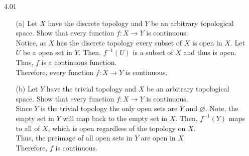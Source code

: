 \documentclass[12pt]{article}
\begin{document}
\pagestyle{fancy}  
\lfoot{} \cfoot{} \rfoot{}

\begin{enumerate}

	\item[4.01] 
	\begin{enumerate}
	
	\item[(a)] Let $X$ have the discrete topology and $Y$ be an arbitrary topological space.
	Show that every function $f : X \rightarrow Y$ is continuous.\\
	Notice, as $ X $ has the discrete topology every subset of $ X $ is open in $ X $. Let $ U $ be a open set in $ Y $. Then, $ f^{-1}(U) $ is a subset of $ X $ and thus is open. \\
	Thus, $ f $ is a continuous function. \\
	Therefore, every function $f : X \rightarrow Y$ is continuous.
	\item[(b)]Let $Y$ have the trivial topology and $X$ be an arbitrary topological space.
	Show that every function $f : X \rightarrow Y$ is continuous.\\
	Since $ Y $ is the trivial topology the only open sets are $ Y $ and $ \varnothing $. Note, the empty set in $ Y $ will map back to the empty set in $ X $. Then, $ f^{-1}(Y) $ maps to all of $ X $, which is open regardless of the topology on $ X $.\\
	Thus, the preimage of all open sets in $ Y $ are open in $ X $\\
	Therefore, $ f $ is continuous.
	

\end{enumerate}
\end{enumerate}
\end{document}
